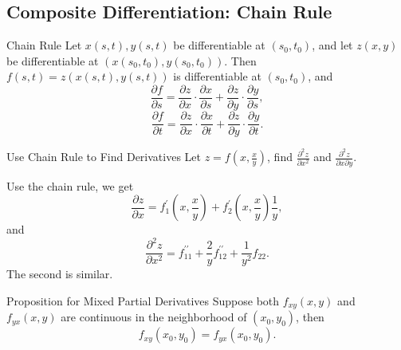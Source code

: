 \subsection{Composite Differentiation: Chain Rule}

\begin{theorem}{Chain Rule}{}
  Let $x(s,t), y(s,t)$ be differentiable at $(s_0, t_0)$,
  and let $z(x, y)$ be differentiable at $(x(s_0, t_0), y(s_0,t_0))$.
  Then $f(s,t) = z(x(s,t), y(s,t))$ is differentiable at $(s_0,t_0)$, and
  \begin{equation}
    \frac{\partial f}{\partial s} = \frac{\partial z}{\partial x} \cdot \frac{\partial x}{\partial s} + \frac{\partial z}{\partial y} \cdot \frac{\partial y}{\partial s},
  \end{equation}
  \begin{equation}
    \frac{\partial f}{\partial t} = \frac{\partial z}{\partial x} \cdot \frac{\partial x}{\partial t} + \frac{\partial z}{\partial y} \cdot \frac{\partial y}{\partial t}.
  \end{equation}
\end{theorem}

\begin{example}{Use Chain Rule to Find Derivatives}{}
  Let $z = f \left( x, \frac{x}{y} \right)$, find $\frac{\partial^2 z}{\partial
    x^2}$ and $\frac{\partial^2 z}{\partial x\partial y}$.
\end{example}

\begin{solution}
  Use the chain rule, we get
  \begin{equation}
    \frac{\partial z}{\partial x} = f_1^{\prime}(x, \frac{x}{y}) + f_2^{\prime}(x, \frac{x}{y}) \frac{1}{y},
  \end{equation}
  and
  \begin{equation}
    \frac{\partial^2 z}{\partial x^2} = f_{11}^{\prime\prime} + \frac{2}{y}f_{12}^{\prime\prime} + \frac{1}{y^2}f_{22}.
  \end{equation}
  The second is similar.
\end{solution}

\begin{proposition}{Proposition for Mixed Partial Derivatives}{}
  Suppose both $f_{xy}(x, y)$ and $f_{yx}(x, y)$ are continuous in the
  neighborhood of $(x_0, y_0)$, then
  \begin{equation}
    f_{xy}(x_0, y_0) = f_{yx}(x_0, y_0).
  \end{equation}
\end{proposition}

